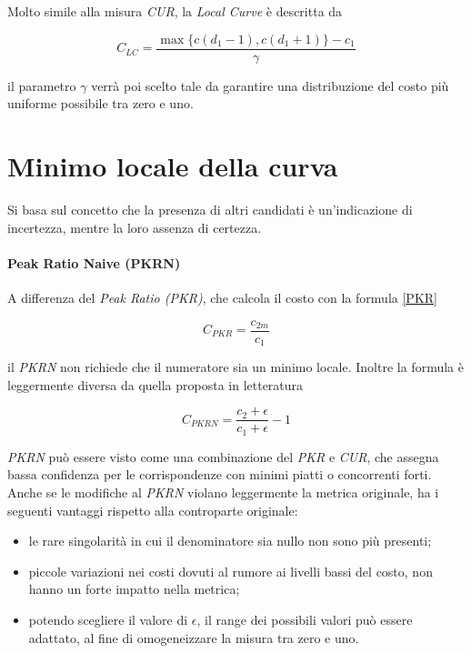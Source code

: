 \documentclass[12pt]{report}
\begin{document}
				Molto simile alla misura \textit{CUR}, la \textit{Local Curve} è descritta da
				
				\begin{equation}
					C_{LC}=\frac {\max\bigr\{ c(d_{1}-1) ,c(d_{1}+1) \bigr\} - c_{1}} {\gamma}
					\label{eq:LC}
				\end{equation}
				
				\noindent il parametro $\gamma$ verrà poi scelto tale da garantire una distribuzione del costo più uniforme possibile tra zero e uno.
			
			
			
		\section{Minimo locale della curva}
		\label{sec:localMinima}	
		
			Si basa sul concetto che la presenza di altri candidati è un'indicazione di incertezza, mentre la loro assenza di certezza.
			
			\paragraph{Peak Ratio Naive (PKRN)} 
			\label{par:PKRN}
		
				A differenza del \textit{Peak Ratio (PKR)}, che calcola il costo con la formula \ref{PKR}
		
				\begin{equation}
					C_{PKR}=\frac{c_{2m}}{c_{1}}
					\label{eq:PKR}
				\end{equation}
			
				\noindent il \textit{PKRN} non richiede che il numeratore sia un minimo locale. Inoltre la formula è leggermente diversa da quella proposta in letteratura \cite{mercedes}
			
				\begin{equation}
					C_{PKRN}=\frac{c_{2} + \epsilon}{c_{1} + \epsilon} - 1
					\label{eq:PKRN}
				\end{equation}
		
				\noindent \textit{PKRN} può essere visto come una combinazione del \textit{PKR} e \textit{CUR}, che assegna bassa confidenza per le corrispondenze con minimi piatti o concorrenti forti. Anche se le modifiche al \textit{PKRN} violano leggermente la metrica originale, ha i seguenti vantaggi rispetto alla controparte originale:
				
				\begin{itemize}
					\item le rare singolarità in cui il denominatore sia nullo non sono più presenti;
					\item piccole variazioni nei costi dovuti al rumore ai livelli bassi del costo, non hanno un forte impatto nella metrica; 
					\item potendo scegliere il valore di $\epsilon$, il range dei possibili valori può essere adattato, al fine di omogeneizzare la misura tra zero e uno.
					\label{item:PKRN}			
				\end{itemize}
				
\end{document}
